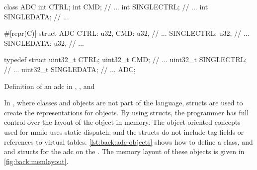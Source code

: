 \begin{listing}[H]
  \centering
  \begin{minipage}{0.26\textwidth}
  \begin{listing}
    \begin{javacode}
class ADC {
  int CTRL;
  int CMD;
  // ...
  int SINGLECTRL;
  // ...
  int SINGLEDATA;
  // ...
}
    \end{javacode}
  \end{listing}
  \end{minipage}
  \hfill
  \begin{minipage}{0.27\textwidth}
  \begin{listing}
    \begin{rustcode}
#[repr(C)]
struct ADC {
  CTRL: u32,
  CMD: u32,
  // ...
  SINGLECTRL: u32,
  // ...
  SINGLEDATA: u32,
  // ...
}
    \end{rustcode}
  \end{listing}
  \end{minipage}
  \hfill
  \begin{minipage}{0.33\textwidth}
  \begin{listing}
    \begin{ccode}
typedef struct {
  uint32_t CTRL;
  uint32_t CMD;
  // ...
  uint32_t SINGLECTRL;
  // ...
  uint32_t SINGLEDATA;
  // ...
} ADC;
    \end{ccode}
  \end{listing}
  \end{minipage}

  \caption{Definition of an \gls{adc} in {\Java}, {\rust}, and {\C}}
  \label{lst:back:adc-objects}
\end{listing}

In {\C}, where classes and objects are not part of the language, structs are used to create the representations for objects.
By using structs, the programmer has full control over the layout of the object in memory.
The object-oriented concepts used for \gls{mmio} uses static dispatch, and the structs do not include tag fields or references to virtual tables.
\autoref{lst:back:adc-objects} shows how to define a {\Java} class, and {\rust} and {\C} structs for the \gls{adc} on the {\gecko}.
The memory layout of these objects is given in \autoref{fig:back:memlayout}.

